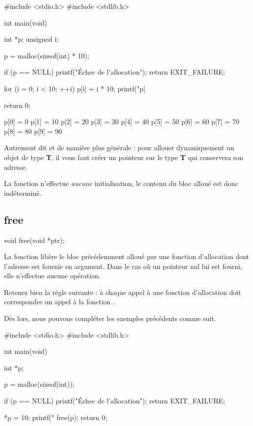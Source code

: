 \begin{C}
#include <stdio.h>
#include <stdlib.h>


int main(void)
{
    int *p;
    unsigned i;

    p = malloc(sizeof(int) * 10);

    if (p == NULL)
    {
        printf("Échec de l'allocation\n");
        return EXIT_FAILURE;
    }

    for (i = 0; i < 10; ++i)
    {
        p[i] = i * 10;
        printf("p[%
    }

    return 0;
}
\end{C}

\begin{C}
p[0] = 0
p[1] = 10
p[2] = 20
p[3] = 30
p[4] = 40
p[5] = 50
p[6] = 60
p[7] = 70
p[8] = 80
p[9] = 90
\end{C}

\begin{infobox} 
 Autrement dit et de manière plus
générale : pour allouer dynamiquement un objet de type \textbf{T}, il
vous faut créer un pointeur sur le type \textbf{T} qui conservera son
adresse.
\end{infobox}


\begin{erreurbox} 
 La fonction  n'effectue
\emph{aucune} initialisation, le contenu du bloc alloué est donc
indéterminé.
\end{erreurbox}


\subsection{free}
\label{free}

\begin{C}
void free(void *ptr);
\end{C}

La fonction  libère le bloc précédemment alloué par une
fonction d'allocation dont l'adresse est fournie en argument. Dans le
cas où un pointeur nul lui est fourni, elle n'effectue aucune opération.

\begin{attentionbox}
Retenez bien la règle suivante : à chaque appel à une fonction d'allocation 
doit correspondre un appel à la fonction .
\end{attentionbox}


Dès lors, nous pouvons compléter les exemples précédents comme suit.

\begin{C}
#include <stdio.h>
#include <stdlib.h>


int main(void)
{
    int *p;

    p = malloc(sizeof(int));

    if (p == NULL)
    {
        printf("Échec de l'allocation\n");
        return EXIT_FAILURE;
    }

    *p = 10;
    printf("%
    free(p);
    return 0;
}
\end{C}

